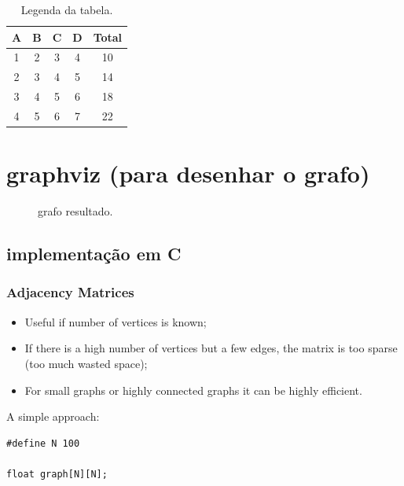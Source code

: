 \documentclass[a4wide]{report}
\begin{document}
\begin{table}[htb]
    \centering
    \begin{tabular}{|cccc|c|}
        \hline
        \textbf{A} & \textbf{B} & 
        \textbf{C} & \textbf{D} & \textbf{Total} \\
        \hline
          1 & 2 & 3 & 4 & 10  \\
          2 & 3 & 4 & 5 & 14  \\
          3 & 4 & 5 & 6 & 18  \\
          4 & 5 & 6 & 7 & 22 \\
          \hline
    \end{tabular}
    \caption{Legenda da tabela.}
    \label{tab:1}
\end{table}
\section{graphviz (para desenhar o grafo)}
\begin{figure}
    \centering
    \caption{grafo resultado. \label{fig:grafo-d}}
\end{figure}

\subsection{implementação em C}

\subsubsection{Adjacency Matrices}
  \begin{itemize}
  \item Useful if number of vertices is known;
  \item If there is a high number of vertices but a few edges, the
    matrix is too sparse (too much wasted space);
  \item For small graphs or highly connected graphs it can be highly
    efficient.
  \end{itemize}


  A simple approach:
  \begin{lstlisting}
#define N 100

float graph[N][N];    
\end{lstlisting}
\end{document}

